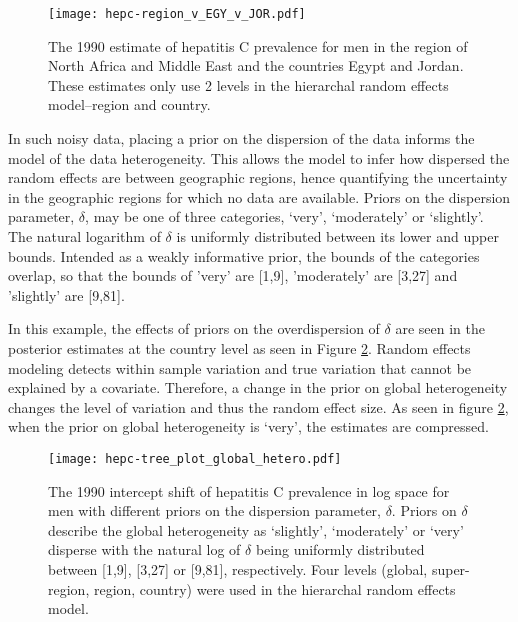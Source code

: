     \begin{figure}[h]
        \begin{center}
            \texttt{[image: hepc-region\_v\_EGY\_v\_JOR.pdf]}
            \caption{The 1990 estimate of hepatitis C prevalence for men in the region of North Africa and Middle East and the countries Egypt and Jordan.  These estimates only use 2 levels in the hierarchal random effects model--region and country.}
            \label{fig:app-hepc regional rfx}
        \end{center}
    \end{figure}

In such noisy data, placing a prior on the dispersion of the data informs the model of the data heterogeneity.  This allows the model to infer how dispersed the random effects are between geographic regions, hence quantifying the uncertainty in the geographic regions for which no data are available.  Priors on the dispersion parameter, $\delta$, may be one of three categories, `very', `moderately' or `slightly'.  The natural logarithm of $\delta$ is uniformly distributed between its lower and upper bounds.  Intended as a weakly informative prior, the bounds of the categories overlap, so that the bounds of 'very' are [1,9], 'moderately' are [3,27] and 'slightly' are [9,81].

In this example, the effects of priors on the overdispersion of $\delta$ are seen in the posterior estimates at the country level as seen in Figure \ref{fig:app-hepc global hetero}.  Random effects modeling detects within sample variation and true variation that cannot be explained by a covariate.  Therefore, a change in the prior on global heterogeneity changes the level of variation and thus the random effect size.  As seen in figure \ref{fig:app-hepc global hetero}, when the prior on global heterogeneity is `very', the estimates are compressed.

    \begin{figure}[h]
        \begin{center}
            \texttt{[image: hepc-tree\_plot\_global\_hetero.pdf]}
            \caption{The 1990 intercept shift of hepatitis C prevalence in log space for men with different priors on the dispersion parameter, $\delta$.  Priors on $\delta$ describe the global heterogeneity as `slightly', `moderately' or `very' disperse with the natural log of $\delta$ being uniformly distributed between [1,9], [3,27] or [9,81], respectively. Four levels (global, super-region, region, country) were used in the hierarchal random effects model.}
            \label{fig:app-hepc global hetero}
        \end{center}
    \end{figure}

